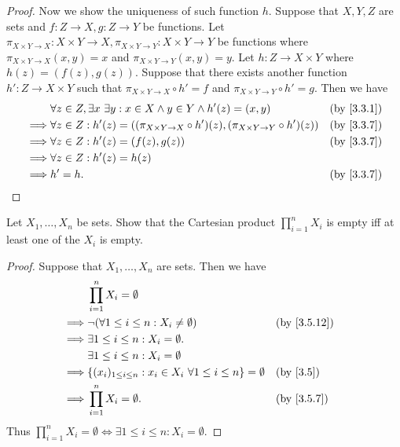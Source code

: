 \begin{proof}
  Now we show the uniqueness of such function \(h\).
  Suppose that \(X, Y, Z\) are sets and \(f : Z \to X, g : Z \to Y\) be functions.
  Let \(\pi_{X \times Y \to X} : X \times Y \to X, \pi_{X \times Y \to Y} : X \times Y \to Y\) be functions where \(\pi_{X \times Y \to X}(x, y) = x\) and \(\pi_{X \times Y \to Y}(x, y) = y\).
  Let \(h : Z \to X \times Y\) where \(h(z) = (f(z), g(z))\).
  Suppose that there exists another function \(h' : Z \to X \times Y\) such that \(\pi_{X \times Y \to X} \circ h' = f\) and \(\pi_{X \times Y \to Y} \circ h' = g\).
  Then we have
  \begin{align*}
             & \forall z \in Z, \exists x \ \exists y : x \in X \land y \in Y \land h'(z) = (x, y)                    &  & \by{3.3.1} \\
    \implies & \forall z \in Z : h'(z) = ((\pi_{X \times Y \to X} \circ h')(z), (\pi_{X \times Y \to Y} \circ h')(z)) &  & \by{3.3.7} \\
    \implies & \forall z \in Z : h'(z) = (f(z), g(z))                                                                 &  & \by{3.3.7} \\
    \implies & \forall z \in Z : h'(z) = h(z)                                                                                         \\
    \implies & h' = h.                                                                                                &  & \by{3.3.7}
  \end{align*}
\end{proof}

\begin{ex}\label{ex:3.5.8}
  Let \(X_1, \dots, X_n\) be sets.
  Show that the Cartesian product \(\prod_{i = 1}^n X_i\) is empty iff at least one of the \(X_i\) is empty.
\end{ex}

\begin{proof}
  Suppose that \(X_1, \dots, X_n\) are sets.
  Then we have
  \begin{align*}
             & \prod_{i = 1}^n X_i = \emptyset                                                                             \\
    \implies & \lnot (\forall 1 \leq i \leq n : X_i \neq \emptyset)                            &  & \by{3.5.12}            \\
    \implies & \exists 1 \leq i \leq n : X_i = \emptyset.                                                                  \\
             & \exists 1 \leq i \leq n : X_i = \emptyset                                                                   \\
    \implies & \{(x_i)_{1 \leq i \leq n} : x_i \in X_i \ \forall 1 \leq i \leq n\} = \emptyset &  & \text{(by \cref{3.5})} \\
    \implies & \prod_{i = 1}^n X_i = \emptyset.                                                &  & \by{3.5.7}
  \end{align*}
  Thus \(\prod_{i = 1}^n X_i = \emptyset \iff \exists 1 \leq i \leq n : X_i = \emptyset\).
\end{proof}

